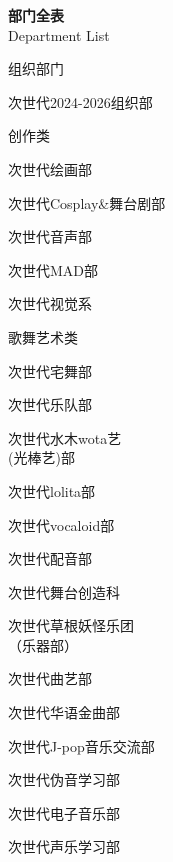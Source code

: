 \vfill
\newpage  %
\begin{center}
    \fontsize{30pt}{32pt}\selectfont
    \textbf{\textcolor{truepurple}{部门全表}}  %
    \\[0ex]  %
    \fontsize{18pt}{20pt}\selectfont
    \textcolor{thuorange}{Department List}  %
\end{center}
\flushleft  %
\begin{multicols}{3}  %
    
    \begin{categorysection}{组织部门}  %
        \item 次世代2024-2026组织部
    \end{categorysection}
    
    \begin{categorysection}{创作类}
        \item 次世代绘画部
        \item 次世代Cosplay\&舞台剧部
        \item 次世代音声部
        \item 次世代MAD部
        \item 次世代视觉系
    \end{categorysection}
    
    \begin{categorysection}{歌舞艺术类}
        \item 次世代宅舞部
        \item 次世代乐队部
        \item 次世代水木wota艺\\(光棒艺)部
        \item 次世代lolita部
        \item 次世代vocaloid部
        \item 次世代配音部
        \item 次世代舞台创造科
        \item 次世代草根妖怪乐团\\（乐器部）
        \item 次世代曲艺部
        \item 次世代华语金曲部
        \item 次世代J-pop音乐交流部
        \item 次世代伪音学习部
        \item 次世代电子音乐部
        \item 次世代声乐学习部
    \end{categorysection}
    

\end{multicols}
